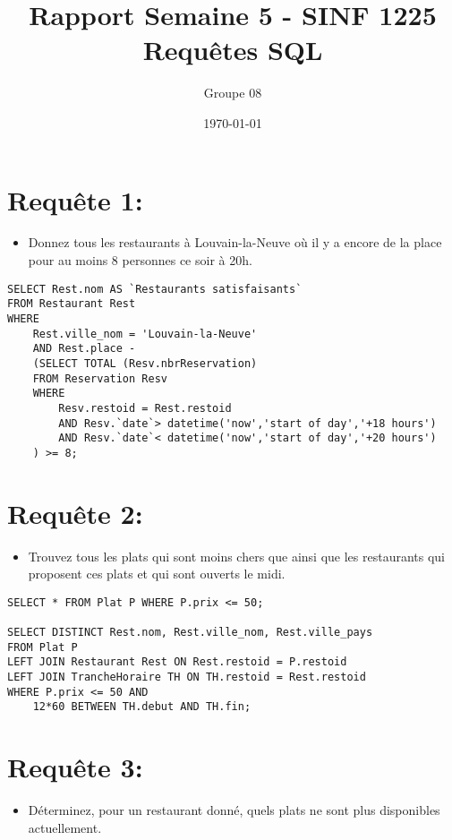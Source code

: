 \documentclass[a4paper, 12pt]{article}
\title{\Huge Rapport Semaine 5 - SINF 1225 \\ Requêtes SQL}
\author{\large Groupe 08}
\date{\large\today}
\begin{document}
\maketitle
\section*{Requête 1:}

\begin{itemize}
\item Donnez tous les restaurants à Louvain-la-Neuve où il y a encore de la place pour au moins 8 personnes ce soir à 20h.
\end{itemize}

\begin{lstlisting} 
SELECT Rest.nom AS `Restaurants satisfaisants`
FROM Restaurant Rest
WHERE
	Rest.ville_nom = 'Louvain-la-Neuve'
	AND Rest.place -
	(SELECT TOTAL (Resv.nbrReservation)
	FROM Reservation Resv
	WHERE 
		Resv.restoid = Rest.restoid
		AND Resv.`date`> datetime('now','start of day','+18 hours')
		AND Resv.`date`< datetime('now','start of day','+20 hours') 
	) >= 8;
\end{lstlisting}

\section*{Requête 2:}

\begin{itemize}
\item Trouvez tous les plats qui sont moins chers que  ainsi que les restaurants qui proposent ces plats et qui sont ouverts le midi.
\end{itemize}

\begin{lstlisting}
SELECT * FROM Plat P WHERE P.prix <= 50;

SELECT DISTINCT Rest.nom, Rest.ville_nom, Rest.ville_pays
FROM Plat P
LEFT JOIN Restaurant Rest ON Rest.restoid = P.restoid
LEFT JOIN TrancheHoraire TH ON TH.restoid = Rest.restoid
WHERE P.prix <= 50 AND
	12*60 BETWEEN TH.debut AND TH.fin;
\end{lstlisting}

\section*{Requête 3:}

\begin{itemize}
\item Déterminez, pour un restaurant donné, quels plats ne sont plus disponibles actuellement.
\end{itemize}
\end{document}
